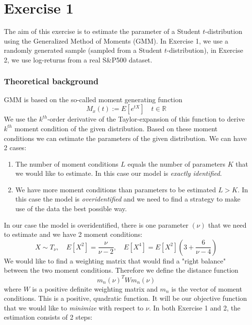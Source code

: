 \chapter{Exercise 1}
The aim of this exercise is to estimate the parameter of a Student $t$-distribution using the Generalized Method of Moments (GMM). In Exercise 1, we use a randomly generated sample (sampled from a Student $t$-distribution), in Exercise 2, we use log-returns from a real S\&P500 dataset. 
\subsection*{Theoretical background}
GMM is based on the so-called moment generating function 
\begin{equation*}
M_x(t):= E[e^{tX}]\quad t\in \mathbb{R}
\end{equation*}
We use the $k^{th}$-order derivative of the Taylor-expansion of this function to derive  $k^{th}$ moment condition of the given distribution. Based on these moment conditions we can estimate the parameters of the given distribution. We can have 2 cases: 
\begin{enumerate}
\item The number of moment conditions $L$ equals the number of parameters $K$ that we would like to estimate. In this case our model is \textit{exactly identified}.
\item We have more moment conditions than parameters to be estimated $L>K$. In this case the model is \textit{overidentified} and we need to find a strategy to make use of the data the best possible way.
\end{enumerate}
In our case the model is overidentified, there is one parameter $(\nu)$ that we need to estimate and we have 2 moment conditions:
\begin{equation*}
X \sim T_{\nu}, \quad E[X^2]=\frac{\nu}{\nu-2}, \quad E[X^4]=E[X^2]\left(3+\frac{6}{\nu-4}\right)
\end{equation*}
We would like to find a weighting matrix that would find a "right balance" between the two moment conditions. Therefore we define the distance function
\begin{equation*}
m_n(\nu)^T W m_n(\nu)
\end{equation*}
where $W$ is a positive definite weighting matrix and $m_n$ is the vector of moment conditions. This is a positive, quadratic function. It will be our objective function that we would like to \textit{minimize} with respect to $\nu$.
In both Exercise 1 and 2, the estimation consists of 2 steps:

